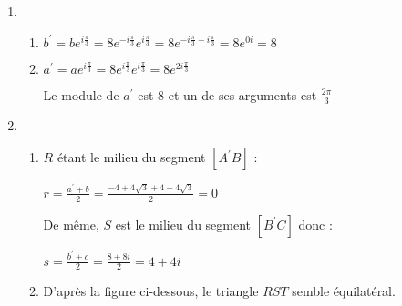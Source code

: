 \begin{corrige}
\begin{enumerate}
\begin{enumerate}[label=\alph*.]
\begin{center}
\end{center}
          \end{enumerate}
          \item
          \begin{enumerate}[label=\alph*.] 
               \item
               $b^{\prime}=b e^{i \frac{\pi}{3}} = 8 e^{-i \frac{\pi}{3}}e^{i \frac{\pi}{3}}=8e^{-i \frac{\pi}{3}+i \frac{\pi}{3}}=8 e^{0i}=8$
               \item
               $a^{\prime}=a e^{i \frac{\pi}{3}} = 8 e^{i \frac{\pi}{3}}e^{i \frac{\pi}{3}}=8e^{2i \frac{\pi}{3}}$
               \par
               Le module de $a^{\prime}$ est $8$ et un de ses arguments est $\frac{2\pi}{3}$
          \end{enumerate}
          \item
          \begin{enumerate}[label=\alph*.] 
               \item
               $R$ étant le milieu du segment $[A^{\prime}B]$ :
               \par
               $r=\frac{a^{\prime}+b}{2}=\frac{-4+4\sqrt{3}+4-4\sqrt{3}}{2}=0$
               \par
               De même, $S$ est le milieu du segment $[B^{\prime}C]$ donc :
               \par
               $s=\frac{b^{\prime}+c}{2}=\frac{8+8i}{2}=4+4i$
               \item
               D'après la figure ci-dessous, le triangle $RST$ semble équilatéral.
\begin{center}
\end{center}


\end{enumerate}
\end{enumerate}
\end{corrige}
